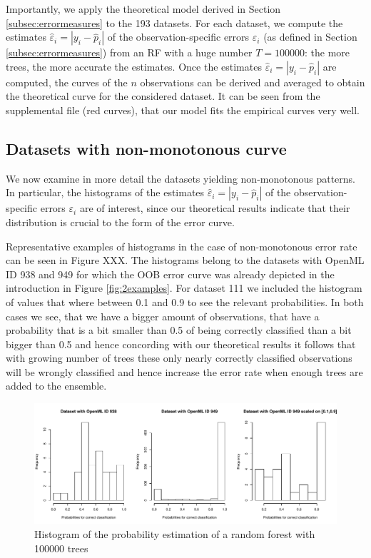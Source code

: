 \documentclass[paper=a4
               ,12pt
               ,DIV=12
               ,parskip=half
               ,titlepage=on
               ,headinclude 
               ,footinclude
               ,headsepline
               ,footsepline         %
               ,ilines 
               ]{scrartcl}
\begin{document}
Importantly, we apply the theoretical model derived in Section \ref{subsec:errormeasures} to the 193 datasets. For each dataset, we compute the estimates $\hat{\varepsilon}_i=|y_i-\hat{p}_i|$  of the observation-specific errors $\varepsilon_i$ (as defined in Section \ref{subsec:errormeasures}) from an RF with a huge number $T=100000$: the more trees, the more accurate the estimates. Once the estimates $\hat{\varepsilon}_i=|y_i-\hat{p}_i|$ are computed, the curves of the $n$ observations can be derived and averaged to obtain the theoretical curve for the considered dataset.
It can be seen from the supplemental file (red curves), that our model fits the empirical curves very well.


\subsection{Datasets with non-monotonous curve}
We now examine in more detail the datasets yielding non-monotonous patterns. In particular, the histograms of the estimates $\hat{\varepsilon}_i=|y_i-\hat{p}_i|$ of the observation-specific errors $\varepsilon_i$  are of interest, since our theoretical results indicate that their distribution is crucial to the form of the error curve. 

Representative examples of histograms in the case of non-monotonous error rate can be seen in Figure XXX. The histograms belong to the datasets with OpenML ID 938 and 949 for which the OOB error curve was already depicted in the introduction in Figure \ref{fig:2examples}. 
For dataset 111 we included the histogram of values that where between 0.1 and 0.9 to see the relevant probabilities. In both cases we see, that we have a bigger amount of observations, that have a probability that is a bit smaller than 0.5
of being correctly classified than a bit bigger than 0.5 and hence concording with our theoretical results it follows that with growing number of trees these only nearly correctly classified observations will be wrongly classified and hence 
increase the error rate when enough trees are added to the ensemble. 

\begin{figure}[!htb]
\begin{center}
  \includegraphics[width=\textwidth]{histogram.pdf}
  \caption{Histogram of the probability estimation of a random forest with 100000 trees}
\end{center}
\end{figure}
\end{document}

